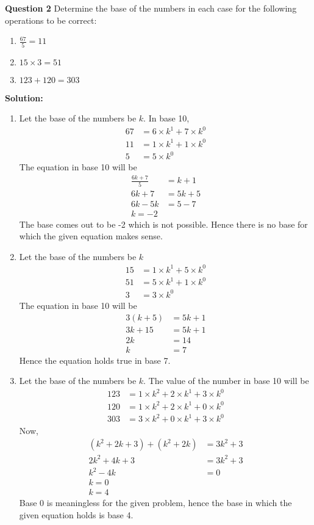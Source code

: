 \documentclass{article}
\begin{document}
\textbf{Question 2}\newline
Determine the base of the numbers in each case for the following operations to be correct:
\begin{enumerate}
  \item $\frac{67}{5} = 11$ \\
  \item $15 \times 3 = 51$\\
  \item $123 + 120 = 303$
\end{enumerate}
\textbf{Solution:}\newline
\begin{enumerate}
  \item Let the base of the numbers be $k$. In base 10, 
    \begin{align*}
      67 &= 6 \times k^1 + 7 \times k^0 \\
      11 &= 1 \times k^1 + 1\times k^0\\
      5 &= 5 \times k^0
    \end{align*}
  The equation in base 10 will be
    \begin{align*}
	    \frac{6k + 7}{5} &= k+1\\
	    6k+7 &= 5k + 5\\
	    6k-5k &= 5-7\\ 
	    k = -2
    \end{align*}
 The base comes out to be -2 which is not possible. Hence there is no base for which the given equation makes sense. 
  \item Let the base of the numbers be $k$
    \begin{align*}
      15 &= 1 \times k^1 + 5 \times k^0 \\
      51 &= 5 \times k^1 + 1\times k^0\\
      3 &= 3 \times k^0
    \end{align*}
  The equation in base 10 will be
    \begin{align*}
	    3(k + 5) &= 5k + 1\\
	    3k+15 &= 5k+1\\
	    2k &= 14\\
	    k &= 7
    \end{align*}
    Hence the equation holds true in base 7.
  \item Let the base of the numbers be $k$. The value of the number in base 10 will be
    \begin{align*}
      123 &= 1 \times k^2 + 2 \times k^1 + 3\times k^0 \\
      120 &= 1 \times k^2 + 2 \times k^1 + 0\times k^0\\
      303 &= 3 \times k^2 + 0 \times k^1 + 3\times k^0
    \end{align*}
  Now, 
    \begin{align*}
      (k^2 + 2k +3) + (k^2 + 2k) &= 3k^2 + 3\\
	    2k^2+4k+3 &= 3k^2+3\\
	    k^2-4k &= 0\\
	    k = 0 \\ k = 4
    \end{align*}
    Base 0 is meaningless for the given problem, hence the base in which the given equation holds is base 4.


\end{enumerate}
\end{document}
